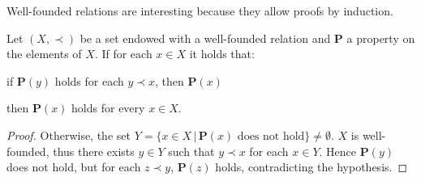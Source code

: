 Well-founded relations are interesting because they allow proofs by induction.
\begin{proposition}
	Let $(X,\prec)$ be a set endowed with a well-founded relation and $\mathbf{P}$ a property on the elements of $X$. If for each $x\in X$ it holds that: 
	\begin{center} if $\mathbf{P}(y)$ holds  for each $y\prec x$, then $\mathbf{P}(x)$\end{center}
	then $\mathbf{P}(x)$ holds for every $x\in X$.
\end{proposition}
\begin{proof}
	Otherwise, the set $Y=\{x\in X\,|\,\mathbf{P}(x)\textrm{ does not hold}\}\neq\emptyset$. $X$ is well-founded, thus there exists $y\in Y$ such that $y\prec x$ for each $x\in Y$. Hence $\mathbf{P}(y)$ does not hold, but for each $z\prec y$, $\mathbf{P}(z)$ holds, contradicting the hypothesis.
\end{proof}

